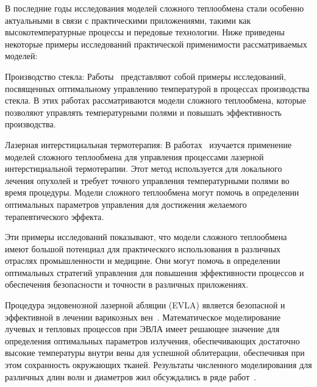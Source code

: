 В последние годы исследования моделей сложного теплообмена стали особенно
актуальными в связи с практическими приложениями, такими
как высокотемпературные процессы и передовые технологии.
Ниже приведены некоторые примеры исследований практической применимости рассматриваемых моделей:

Производство стекла: Работы~\cite{frank2010optimal, clever2012optimal} представляют
собой примеры исследований, посвященных оптимальному
управлению температурой в процессах производства стекла.
В этих работах рассматриваются модели сложного теплообмена, которые позволяют управлять
температурными полями и повышать эффективность производства.

Лазерная интерстициальная термотерапия: В работах~\cite{Tse2012, Hubner2017}
изучается применение моделей сложного теплообмена для
управления процессами лазерной интерстициальной термотерапии.
Этот метод используется для локального лечения опухолей и
требует точного управления температурными полями во время процедуры.
Модели сложного теплообмена могут помочь в определении оптимальных
параметров управления для достижения желаемого терапевтического эффекта.

Эти примеры исследований показывают, что модели сложного теплообмена имеют
большой потенциал для практического использования в различных отраслях промышленности и медицине.
Они могут помочь в определении оптимальных стратегий
управления для повышения эффективности процессов
и обеспечения безопасности и точности в различных приложениях.

Процедура эндовенозной лазерной абляции (EVLA) является безопасной и эффективной
в лечении варикозных вен~\cite{Endovenous_vandenBos2009}.
Математическое моделирование лучевых и тепловых процессов при ЭВЛА
имеет решающее значение для определения оптимальных параметров
излучения, обеспечивающих достаточно высокие
температуры внутри вены для успешной облитерации,
обеспечивая при этом сохранность окружающих тканей.
Результаты численного моделирования для различных
длин волн и диаметров жил обсуждались в ряде работ~\cite{
    Opticalthermal_vanRuijven2014, Some_Poluektova2014,
    Endovenous_Malskat2014, Mathematical_Mordon2006
}.

%


